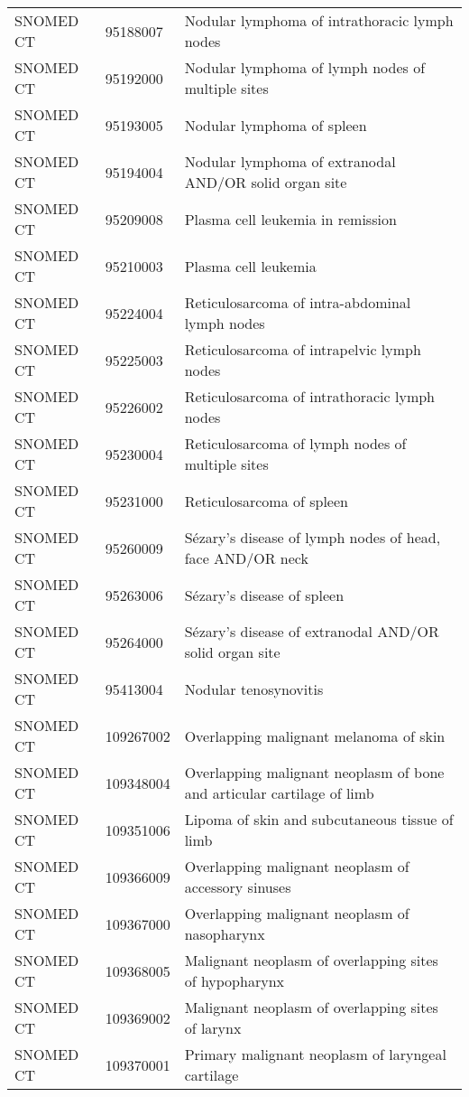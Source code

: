 \begin{longtable}{p{}p{}p{}}
  SNOMED CT & 95188007 & Nodular lymphoma of intrathoracic lymph nodes \\ 
  SNOMED CT & 95192000 & Nodular lymphoma of lymph nodes of multiple sites \\ 
  SNOMED CT & 95193005 & Nodular lymphoma of spleen \\ 
  SNOMED CT & 95194004 & Nodular lymphoma of extranodal AND/OR solid organ site \\ 
  SNOMED CT & 95209008 & Plasma cell leukemia in remission \\ 
  SNOMED CT & 95210003 & Plasma cell leukemia \\ 
  SNOMED CT & 95224004 & Reticulosarcoma of intra-abdominal lymph nodes \\ 
  SNOMED CT & 95225003 & Reticulosarcoma of intrapelvic lymph nodes \\ 
  SNOMED CT & 95226002 & Reticulosarcoma of intrathoracic lymph nodes \\ 
  SNOMED CT & 95230004 & Reticulosarcoma of lymph nodes of multiple sites \\ 
  SNOMED CT & 95231000 & Reticulosarcoma of spleen \\ 
  SNOMED CT & 95260009 & Sézary's disease of lymph nodes of head, face AND/OR neck \\ 
  SNOMED CT & 95263006 & Sézary's disease of spleen \\ 
  SNOMED CT & 95264000 & Sézary's disease of extranodal AND/OR solid organ site \\ 
  SNOMED CT & 95413004 & Nodular tenosynovitis \\ 
  SNOMED CT & 109267002 & Overlapping malignant melanoma of skin \\ 
  SNOMED CT & 109348004 & Overlapping malignant neoplasm of bone and articular cartilage of limb \\ 
  SNOMED CT & 109351006 & Lipoma of skin and subcutaneous tissue of limb \\ 
  SNOMED CT & 109366009 & Overlapping malignant neoplasm of accessory sinuses \\ 
  SNOMED CT & 109367000 & Overlapping malignant neoplasm of nasopharynx \\ 
  SNOMED CT & 109368005 & Malignant neoplasm of overlapping sites of hypopharynx \\ 
  SNOMED CT & 109369002 & Malignant neoplasm of overlapping sites of larynx \\ 
  SNOMED CT & 109370001 & Primary malignant neoplasm of laryngeal cartilage \\ 

\end{longtable}
